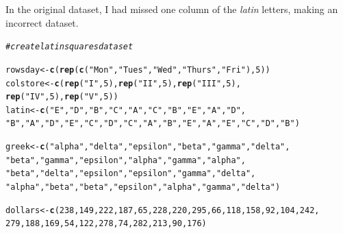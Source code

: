 \documentclass{article}\usepackage[]{graphicx}\usepackage[]{color}
\makeatletter
\newcommand{\hlnum}[1]{\textcolor[rgb]{0.686,0.059,0.569}{#1}}%
\newcommand{\hlstr}[1]{\textcolor[rgb]{0.192,0.494,0.8}{#1}}%
\newcommand{\hlcom}[1]{\textcolor[rgb]{0.678,0.584,0.686}{\textit{#1}}}%
\newcommand{\hlstd}[1]{\textcolor[rgb]{0.345,0.345,0.345}{#1}}%
\newcommand{\hlkwb}[1]{\textcolor[rgb]{0.69,0.353,0.396}{#1}}%
\newcommand{\hlkwd}[1]{\textcolor[rgb]{0.737,0.353,0.396}{\textbf{#1}}}%
\newenvironment{kframe}{%
 \def\at@end@of@kframe{}%
 \ifinner\ifhmode%
  \def\at@end@of@kframe{\end{minipage}}%
  \begin{minipage}{\columnwidth}%
 \fi\fi%
 \def\FrameCommand##1{\hskip\@totalleftmargin \hskip-\fboxsep
 \colorbox{shadecolor}{##1}\hskip-\fboxsep
     \hskip-\linewidth \hskip-\@totalleftmargin \hskip\columnwidth}%
 \MakeFramed {\advance\hsize-\width
   \@totalleftmargin\z@ \linewidth\hsize
   \@setminipage}}%
 {\par\unskip\endMakeFramed%
 \at@end@of@kframe}
\newenvironment{knitrout}{}{} %
\makeatother
\begin{document}
\begin{enumerate}
In the original dataset, I had missed one column of the {\it latin} letters, making an incorrect dataset.

\begin{knitrout}\footnotesize
{}\color{fgcolor}\begin{kframe}
\begin{alltt}
\hlcom{# create latin squares data set}

\hlstd{rowsday} \hlkwb{<-} \hlkwd{c}\hlstd{(}\hlkwd{rep}\hlstd{(}\hlkwd{c}\hlstd{(}\hlstr{"Mon"}\hlstd{,} \hlstr{"Tues"}\hlstd{,} \hlstr{"Wed"}\hlstd{,} \hlstr{"Thurs"}\hlstd{,} \hlstr{"Fri"}\hlstd{),}\hlnum{5}\hlstd{))}
\hlstd{colstore} \hlkwb{<-} \hlkwd{c}\hlstd{(}\hlkwd{rep}\hlstd{(}\hlstr{"I"}\hlstd{,} \hlnum{5}\hlstd{),} \hlkwd{rep}\hlstd{(}\hlstr{"II"}\hlstd{,} \hlnum{5}\hlstd{),} \hlkwd{rep}\hlstd{(}\hlstr{"III"}\hlstd{,} \hlnum{5}\hlstd{),}
              \hlkwd{rep}\hlstd{(}\hlstr{"IV"}\hlstd{,} \hlnum{5}\hlstd{),} \hlkwd{rep}\hlstd{(}\hlstr{"V"}\hlstd{,} \hlnum{5}\hlstd{))}
\hlstd{latin} \hlkwb{<-} \hlkwd{c}\hlstd{(}\hlstr{"E"}\hlstd{,} \hlstr{"D"}\hlstd{,} \hlstr{"B"}\hlstd{,} \hlstr{"C"}\hlstd{,} \hlstr{"A"}\hlstd{,} \hlstr{"C"}\hlstd{,} \hlstr{"B"}\hlstd{,} \hlstr{"E"}\hlstd{,} \hlstr{"A"}\hlstd{,} \hlstr{"D"}\hlstd{,}
           \hlstr{"B"}\hlstd{,} \hlstr{"A"}\hlstd{,} \hlstr{"D"}\hlstd{,} \hlstr{"E"}\hlstd{,} \hlstr{"C"}\hlstd{,}\hlstr{"D"}\hlstd{,} \hlstr{"C"}\hlstd{,} \hlstr{"A"}\hlstd{,} \hlstr{"B"}\hlstd{,} \hlstr{"E"}\hlstd{,} \hlstr{"A"}\hlstd{,} \hlstr{"E"}\hlstd{,} \hlstr{"C"}\hlstd{,} \hlstr{"D"}\hlstd{,} \hlstr{"B"}\hlstd{)}

\hlstd{greek} \hlkwb{<-} \hlkwd{c}\hlstd{(}\hlstr{"alpha"}\hlstd{,} \hlstr{"delta"}\hlstd{,} \hlstr{"epsilon"}\hlstd{,} \hlstr{"beta"}\hlstd{,} \hlstr{"gamma"}\hlstd{,} \hlstr{"delta"}\hlstd{,}
           \hlstr{"beta"}\hlstd{,} \hlstr{"gamma"}\hlstd{,} \hlstr{"epsilon"}\hlstd{,} \hlstr{"alpha"}\hlstd{,} \hlstr{"gamma"}\hlstd{,} \hlstr{"alpha"}\hlstd{,}
           \hlstr{"beta"}\hlstd{,} \hlstr{"delta"}\hlstd{,} \hlstr{"epsilon"}\hlstd{,} \hlstr{"epsilon"}\hlstd{,} \hlstr{"gamma"}\hlstd{,} \hlstr{"delta"}\hlstd{,}
           \hlstr{"alpha"}\hlstd{,} \hlstr{"beta"}\hlstd{,} \hlstr{"beta"}\hlstd{,} \hlstr{"epsilon"}\hlstd{,} \hlstr{"alpha"}\hlstd{,} \hlstr{"gamma"}\hlstd{,} \hlstr{"delta"}\hlstd{)}

\hlstd{dollars} \hlkwb{<-} \hlkwd{c}\hlstd{(}\hlnum{238}\hlstd{,}\hlnum{149}\hlstd{,}\hlnum{222}\hlstd{,}\hlnum{187}\hlstd{,}\hlnum{65}\hlstd{,}\hlnum{228}\hlstd{,}\hlnum{220}\hlstd{,}\hlnum{295}\hlstd{,}\hlnum{66}\hlstd{,}\hlnum{118}\hlstd{,}\hlnum{158}\hlstd{,}\hlnum{92}\hlstd{,}\hlnum{104}\hlstd{,}\hlnum{242}\hlstd{,}
             \hlnum{279}\hlstd{,}\hlnum{188}\hlstd{,}\hlnum{169}\hlstd{,}\hlnum{54}\hlstd{,}\hlnum{122}\hlstd{,}\hlnum{278}\hlstd{,}\hlnum{74}\hlstd{,}\hlnum{282}\hlstd{,}\hlnum{213}\hlstd{,}\hlnum{90}\hlstd{,}\hlnum{176}\hlstd{)}


\end{alltt}
\end{kframe}
\end{knitrout}
\end{enumerate}
\end{document}

